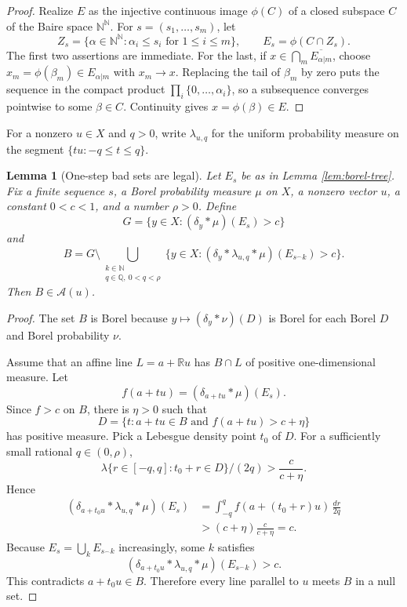 \documentclass[11pt]{amsart}
\newtheorem{lemma}[theorem]{Lemma}
\newcommand{\R}{\mathbb R}
\newcommand{\N}{\mathbb N}
\newcommand{\Q}{\mathbb Q}
\newcommand{\Acal}{\mathcal A}
\begin{document}
\begin{proof}
Realize \(E\) as the injective continuous image \(\phi(C)\) of a closed
subspace \(C\) of the Baire space \(\N^\N\).  For
\(s=(s_1,\ldots,s_m)\), let
\[
  Z_s=\{\alpha\in\N^\N:\alpha_i\le s_i\text{ for }1\le i\le m\},
  \qquad E_s=\phi(C\cap Z_s).
\]
The first two assertions are immediate.  For the last, if
\(x\in\bigcap_m\overline{E_{\alpha|m}}\), choose
\(x_m=\phi(\beta_m)\in E_{\alpha|m}\) with \(x_m\to x\).  Replacing the tail of
\(\beta_m\) by zero puts the sequence in the compact product
\(\prod_i\{0,\ldots,\alpha_i\}\), so a subsequence converges pointwise to some
\(\beta\in C\).  Continuity gives \(x=\phi(\beta)\in E\).
\end{proof}

For a nonzero \(u\in X\) and \(q>0\), write \(\lambda_{u,q}\) for the uniform
probability measure on the segment \(\{tu:-q\le t\le q\}\).

\begin{lemma}[One-step bad sets are legal]\label{lem:bad-legal}
Let \(E_s\) be as in Lemma \ref{lem:borel-tree}.  Fix a finite sequence
\(s\), a Borel probability measure \(\mu\) on \(X\), a nonzero vector \(u\), a
constant \(0<c<1\), and a number \(\rho>0\).  Define
\[
  G=\{y\in X:(\delta_y*\mu)(E_s)>c\}
\]
and
\[
  B=G\setminus
  \bigcup_{\substack{k\in\N\\q\in\Q,\ 0<q<\rho}}
  \{y\in X:(\delta_y*\lambda_{u,q}*\mu)(E_{s^\frown k})>c\}.
\]
Then \(B\in\Acal(u)\).
\end{lemma}

\begin{proof}
The set \(B\) is Borel because \(y\mapsto(\delta_y*\nu)(D)\) is Borel for each
Borel \(D\) and Borel probability \(\nu\).

Assume that an affine line \(L=a+\R u\) has \(B\cap L\) of positive
one-dimensional measure.  Let
\[
  f(a+tu)=(\delta_{a+tu}*\mu)(E_s).
\]
Since \(f>c\) on \(B\), there is \(\eta>0\) such that
\[
  D=\{t:a+tu\in B\text{ and }f(a+tu)>c+\eta\}
\]
has positive measure.  Pick a Lebesgue density point \(t_0\) of \(D\).  For a
sufficiently small rational \(q\in(0,\rho)\),
\[
  \lambda\{r\in[-q,q]:t_0+r\in D\}/(2q)>\frac{c}{c+\eta}.
\]
Hence
\[
\begin{aligned}
(\delta_{a+t_0u}*\lambda_{u,q}*\mu)(E_s)
  &= \int_{-q}^{q} f(a+(t_0+r)u)\,\frac{dr}{2q}  \\
  &> (c+\eta)\frac{c}{c+\eta}=c.
\end{aligned}
\]
Because \(E_s=\bigcup_k E_{s^\frown k}\) increasingly, some \(k\) satisfies
\[
  (\delta_{a+t_0u}*\lambda_{u,q}*\mu)(E_{s^\frown k})>c.
\]
This contradicts \(a+t_0u\in B\).  Therefore every line parallel to \(u\)
meets \(B\) in a null set.
\end{proof}
\end{document}
